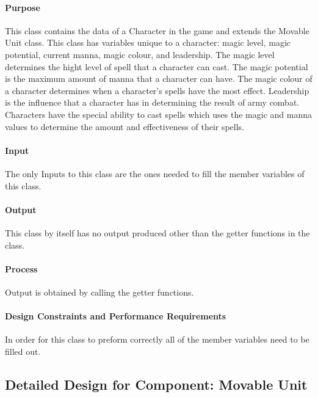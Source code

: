 \documentclass[12pt,a4paper]{article}
\begin{document}
\paragraph{Purpose} This class contains the data of a Character in the game and extends the Movable Unit class. This class has variables unique to a character: magic level, magic potential, current manna, magic colour, and leadership. The magic level determines the hight level of spell that a character can cast. The magic potential is the maximum amount of manna that a character can have. The magic colour of a character determines when a character's spells have the most effect. Leadership is the influence that a character has in determining the result of army combat. Characters have the special ability to cast spells which uses the magic and manna values to determine the amount and effectiveness of their spells. 
\paragraph{Input} The only Inputs to this class are the ones needed to fill the member variables of this class.
\paragraph{Output} This class by itself has no output produced other than the getter functions in the class.
\paragraph{Process} Output is obtained by calling the getter functions. 
\paragraph{Design Constraints and Performance Requirements} In order for this class to preform correctly all of the member variables need to be filled out.
	
\subsection{Detailed Design for Component: Movable Unit}
\end{document}
